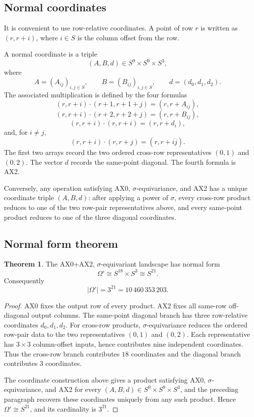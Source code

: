 \documentclass[11pt]{article}
\theoremstyle{definition}
\newtheorem{theorem}{Theorem}[section]
\begin{document}
\subsection{Normal coordinates}\label{normal-coordinates}

It is convenient to use row-relative coordinates.  A point of row \(r\) is
written as \((r,r+i)\), where \(i\in S\) is the column offset from the row.

A normal coordinate is a triple
\[
(A,B,d)\in S^9\times S^9\times S^3,
\]
where
\[
A=(A_{ij})_{i,j\in S},
\qquad
B=(B_{ij})_{i,j\in S},
\qquad
 d=(d_0,d_1,d_2).
\]
The associated multiplication is defined by the four formulas
\[
(r,r+i)\cdot(r+1,r+1+j)=(r,r+A_{ij}),
\]
\[
(r,r+i)\cdot(r+2,r+2+j)=(r,r+B_{ij}),
\]
\[
(r,r+i)\cdot(r,r+i)=(r,r+d_i),
\]
and, for \(i\ne j\),
\[
(r,r+i)\cdot(r,r+j)=(r,r+\overline{ij}).
\]
The first two arrays record the two ordered cross-row representatives
\((0,1)\) and \((0,2)\).  The vector \(d\) records the same-point diagonal.
The fourth formula is AX2.

Conversely, any operation satisfying AX0, \(\sigma\)-equivariance, and AX2
has a unique coordinate triple \((A,B,d)\): after applying a power of
\(\sigma\), every cross-row product reduces to one of the two row-pair
representatives above, and every same-point product reduces to one of the
three diagonal coordinates.

\subsection{Normal form theorem}\label{normal-form-theorem}

\begin{theorem}
\label{thm:1.1}
The AX0+AX2, \(\sigma\)-equivariant landscape has normal form
\[
\Omega'\cong S^{18}\times S^3\cong S^{21}.
\]
Consequently
\[
|\Omega'|=3^{21}=10\,460\,353\,203.
\]
\end{theorem}

\begin{proof}
AX0 fixes the output row of every product.  AX2 fixes all same-row
off-diagonal output columns.  The same-point diagonal branch has three
row-relative coordinates \(d_0,d_1,d_2\).  For cross-row products,
\(\sigma\)-equivariance reduces the ordered row-pair data to the two
representatives \((0,1)\) and \((0,2)\).  Each representative has
\(3\times3\) column-offset inputs, hence contributes nine independent
coordinates.  Thus the cross-row branch contributes \(18\) coordinates and
the diagonal branch contributes \(3\) coordinates.

The coordinate construction above gives a product satisfying AX0,
\(\sigma\)-equivariance, and AX2 for every \((A,B,d)\in S^9\times S^9
\times S^3\), and the preceding paragraph recovers these coordinates
uniquely from any such product.  Hence \(\Omega'\cong S^{21}\), and its
cardinality is \(3^{21}\).
\end{proof}
\end{document}
